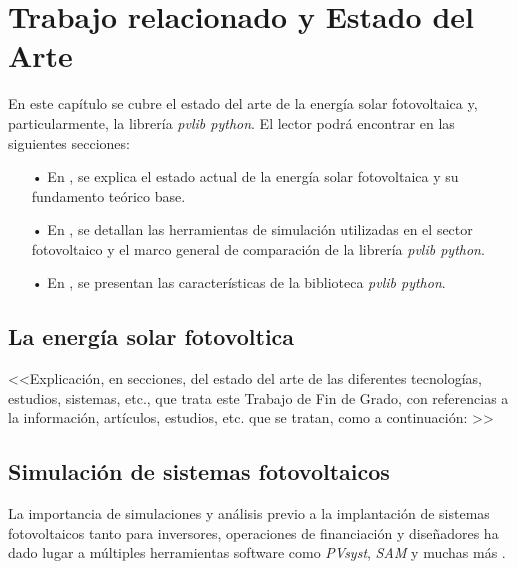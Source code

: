 \chapter{Trabajo relacionado y Estado del Arte} \label{chp:state-of-the-art}

En este capítulo se cubre el estado del arte de la energía solar fotovoltaica y, particularmente, la librería \textit{pvlib python}. El lector podrá encontrar en las siguientes secciones:

\begin{itemize}

    \item[•] En , se explica el estado actual de la energía solar fotovoltaica y su fundamento teórico base.

    \item[•] En , se detallan las herramientas de simulación utilizadas en el sector fotovoltaico y el marco general de comparación de la librería \textit{pvlib python}.

    \item[•] En , se presentan las características de la biblioteca \textit{pvlib python}.

\end{itemize}


\section{La energía solar fotovoltica} \label{sct:energia-solar}

<<Explicación, en secciones, del estado del arte de las diferentes tecnologías, estudios, sistemas, etc., que trata este Trabajo de Fin de Grado, con referencias a la información, artículos, estudios, etc. que se tratan, como a continuación: \cite{stein_models_2009}>>

\section{Simulación de sistemas fotovoltaicos} \label{sct:simulaciones}

La importancia de simulaciones y análisis previo a la implantación de sistemas fotovoltaicos tanto para inversores, operaciones de financiación y diseñadores ha dado lugar a múltiples herramientas software como \textit{PVsyst}, \textit{SAM} y muchas más \cite{stein_models_2009}.

